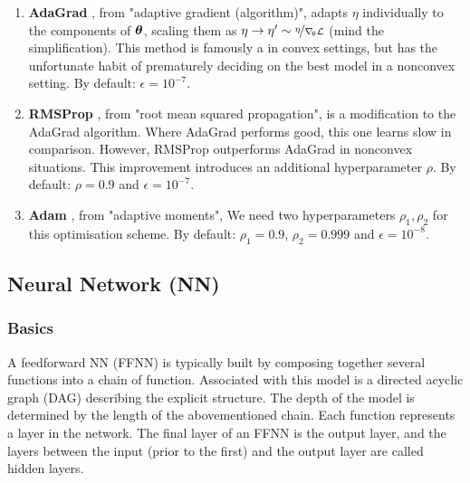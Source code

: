     \begin{enumerate}[leftmargin=0pt,labelwidth=!,labelsep=.05em]
        \item[]\textbf{AdaGrad} \citep[algorithm 8.4]{Goodfellow2016}, from "adaptive gradient (algorithm)", adapts $\eta$ individually to the components of $\boldsymbol{\theta}$, scaling them as $\eta \to \eta' \sim \nicefrac{\eta}{\nabla_{\! \theta} \mathcal{L}}$ (mind the simplification). This method is famously a  in convex settings, but has the unfortunate habit of prematurely deciding on the best model in a nonconvex setting. By default: $\epsilon=10^{-7}$.
        \item[]\textbf{RMSProp} \citep[algorithm 8.5]{Goodfellow2016}, from "root mean squared propagation", is a modification to the AdaGrad algorithm. Where AdaGrad performs good, this one learns slow in comparison. However, RMSProp outperforms AdaGrad in nonconvex situations. This improvement introduces an additional hyperparameter $\rho$. By default: $\rho = 0.9$ and $\epsilon=10^{-7}$.
        \item[]\textbf{Adam} \citep[algorithm 8.7]{Goodfellow2016}, from "adaptive moments", \fillertext We need two hyperparameters $\rho_1, \rho_2$ for this optimisation scheme. By default: $\rho_1 = 0.9$, $\rho_2=0.999$ and $\epsilon=10^{-8}$.
    \end{enumerate}

    
    
\subsection{Neural Network (NN)}\label{sec:neural_network}

    \subsubsection{Basics}\label{sec:basics}

    A feedforward NN (FFNN) is typically built by composing together several functions into a chain of function. Associated with this model is a directed acyclic graph (DAG) describing the explicit structure. The depth of the model is determined by the length of the abovementioned chain. Each function represents a layer in the network. The final layer of an FFNN is the output layer, and the layers between the input (prior to the first) and the output layer are called hidden layers. \citep{Goodfellow2016}

